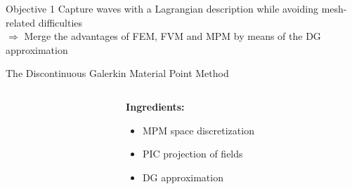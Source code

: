 \begin{withoutheadline}
  \begin{frame}{\text{  }}
    \begin{block}{Objective 1}
      Capture waves with a Lagrangian description while avoiding mesh-related difficulties \\
      \alert{$\Rightarrow$ Merge the advantages of FEM, FVM and MPM by means of the DG approximation}
    \end{block}
    \begin{block}{The Discontinuous Galerkin Material Point Method}
      \begin{columns}
        \begin{column}{0.6\textwidth}
            
        \end{column}
        \begin{column}{0.4\textwidth}
          \textbf{Ingredients:}
          \begin{itemize}
          \item MPM space discretization
          \item PIC projection of fields
          \item DG approximation
          \end{itemize}
        \end{column}
      \end{columns}
    \end{block}
  \end{frame}
\end{withoutheadline}

